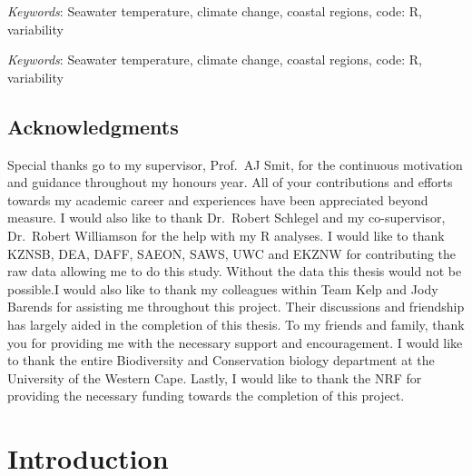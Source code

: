 \documentclass[10pt,a4paper,]{article}
\begin{document}
\emph{Keywords}: Seawater temperature, climate change, coastal regions,
code: R, variability

\emph{Keywords}: Seawater temperature, climate change, coastal regions,
code: R, variability

\newpage

\hypertarget{acknowledgments}{%
\subsection{Acknowledgments}\label{acknowledgments}}

Special thanks go to my supervisor, Prof.~AJ Smit, for the continuous
motivation and guidance throughout my honours year. All of your
contributions and efforts towards my academic career and experiences
have been appreciated beyond measure. I would also like to thank
Dr.~Robert Schlegel and my co-supervisor, Dr.~Robert Williamson for the
help with my R analyses. I would like to thank KZNSB, DEA, DAFF, SAEON,
SAWS, UWC and EKZNW for contributing the raw data allowing me to do this
study. Without the data this thesis would not be possible.I would also
like to thank my colleagues within Team Kelp and Jody Barends for
assisting me throughout this project. Their discussions and friendship
has largely aided in the completion of this thesis. To my friends and
family, thank you for providing me with the necessary support and
encouragement. I would like to thank the entire Biodiversity and
Conservation biology department at the University of the Western Cape.
Lastly, I would like to thank the NRF for providing the necessary
funding towards the completion of this project.

\newpage

\hypertarget{introduction}{%
\section{Introduction}\label{introduction}}
\end{document}
